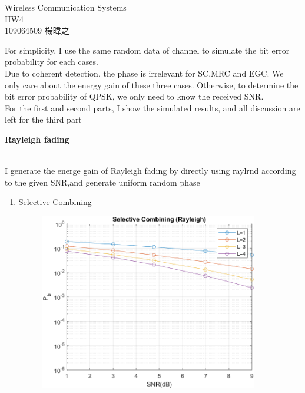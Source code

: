 \documentclass{article}
\begin{document}
\begin{titlepage}
\vspace*{\fill}
\begin{center}
\huge Wireless Communication Systems \\HW4\\ 109064509 楊暐之
\end{center}
\vspace{\fill}
\end{titlepage}

\begin{flushleft}
For simplicity, I use the same random data of channel to simulate the bit error probability for each cases.\\
Due to coherent detection, the phase is irrelevant for SC,MRC and EGC. We only care about the energy gain of these three cases.
Otherwise, to determine the bit error probability of QPSK, we only need to know the received SNR.\\
For the first and second parts, I show the simulated results, and all discussion are left for the third part \\[0.5cm]
\begin{enumerate}
	{\Large \item  \bf Rayleigh fading}\\
	I generate the energe gain of  Rayleigh fading by directly using raylrnd according to the given SNR,and generate uniform random phase 
	\begin{enumerate}
		\item  Selective Combining\\
			\begin{figure}[H]
			\centering
			\includegraphics[width=0.9\textwidth, height=0.44\textheight]{Rayleigh_SC}

\end{figure}
\end{enumerate}
\end{enumerate}
\end{flushleft}
\end{document}
